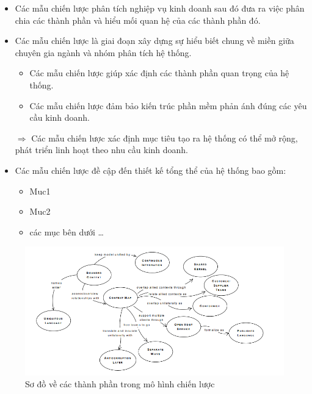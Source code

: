 \begin{itemize}

\item Các mẫu chiến lược phân tích nghiệp vụ kinh doanh sau đó đưa ra việc phân chia các thành phần và hiểu mối quan hệ của các thành phần đó.

\item Các mẫu chiến lược là giai đoạn xây dựng sự hiểu biết chung về miền giữa chuyên gia ngành và nhóm phân tích hệ thống.

\begin{itemize}

\item Các mẫu chiến lược giúp xác định các thành phần quan trọng của hệ thống.

\item Các mẫu chiến lược đảm bảo kiến trúc phần mềm phản ánh đúng các yêu cầu kinh doanh.

\end{itemize}

$\Rightarrow$ Các mẫu chiến lược xác định mục tiêu tạo ra hệ thống có thể mở rộng, phát triển linh hoạt theo nhu cầu kinh doanh.

\item Các mẫu chiến lược đề cập đến thiết kế tổng thể của hệ thống bao gồm:

\begin{itemize}

\item Muc1

\item Muc2

\item các mục bên dưới \dots

\end{itemize}

\end{itemize}

\begin{figure}[H]

\centering

\includegraphics[width = 1\textwidth]{pictures/CacMoHinhChienLuoc/temp.png}

\caption{Sơ đồ về các thành phần trong mô hình chiến lược}

\end{figure}

